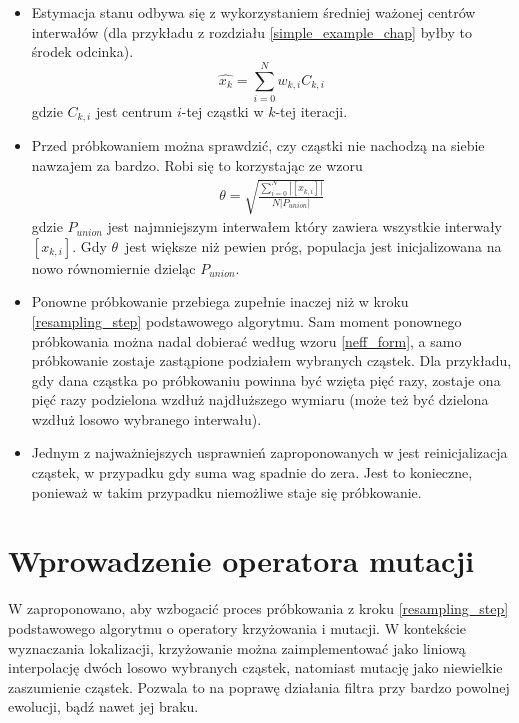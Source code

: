 \begin{itemize}
	\item Estymacja stanu odbywa się z wykorzystaniem średniej ważonej centrów interwałów (dla przykładu z rozdziału \ref{simple_example_chap} byłby to środek odcinka).
	\begin{equation} \label{bpf_est}
		\hat{x_k} = \sum_{i=0}^{N} w_{k,i} C_{k,i}
	\end{equation}
	gdzie $C_{k,i}$ jest centrum $i$-tej cząstki w $k$-tej iteracji.
	\item Przed próbkowaniem można sprawdzić, czy cząstki nie nachodzą na siebie nawzajem za bardzo. Robi się to korzystając ze wzoru
	\begin{equation}\label{theta_coeff}
		\begin{aligned}
			\theta = \sqrt{\frac{\sum_{i=0}^{N}|[x_{k,i}]|}{N |P_{union}|}}
		\end{aligned}
	\end{equation}
	gdzie $P_{union}$ jest najmniejszym interwałem który zawiera wszystkie interwały $[x_{k,i}]$. Gdy $\theta$~jest większe niż pewien próg, populacja jest inicjalizowana na nowo równomiernie dzieląc $P_{union}$.
	
	\item Ponowne próbkowanie przebiega zupełnie inaczej niż w kroku \ref{resampling_step} podstawowego algorytmu. Sam moment ponownego próbkowania można nadal dobierać według wzoru \ref{neff_form}, a samo próbkowanie zostaje zastąpione podziałem wybranych cząstek. Dla przykładu, gdy dana cząstka po próbkowaniu powinna być wzięta pięć razy, zostaje ona pięć razy podzielona wzdłuż najdłuższego wymiaru (może też być dzielona wzdłuż losowo wybranego interwału).
	\item Jednym z najważniejszych usprawnień zaproponowanych w \cite{brbpf} jest reinicjalizacja cząstek, w przypadku gdy suma wag spadnie do zera. Jest to konieczne, ponieważ w takim przypadku niemożliwe staje się próbkowanie.
\end{itemize}

\section{Wprowadzenie operatora mutacji} \label{evol_chap}
W \cite{pfgen} zaproponowano, aby wzbogacić proces próbkowania z kroku \ref{resampling_step} podstawowego algorytmu o operatory krzyżowania i mutacji. W kontekście wyznaczania lokalizacji, krzyżowanie można zaimplementować jako liniową interpolację dwóch losowo wybranych cząstek, natomiast mutację jako niewielkie zaszumienie cząstek. Pozwala to na poprawę działania filtra przy bardzo powolnej ewolucji, bądź nawet jej braku.
